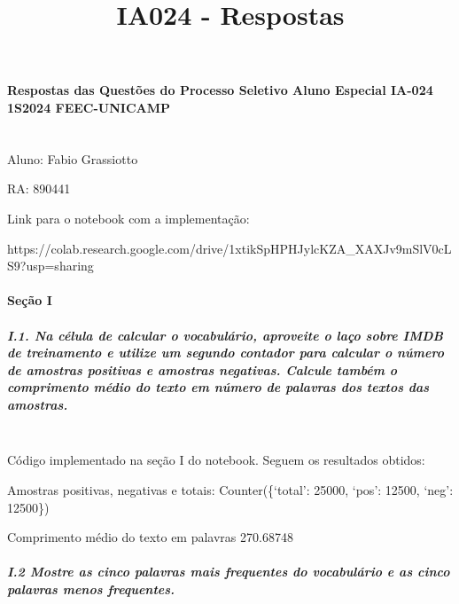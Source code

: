 \documentclass[11pt]{article}
\title{IA024 - Respostas}
\begin{document}
    
    \maketitle
    
    

    
    \paragraph{Respostas das Questões do Processo Seletivo Aluno Especial
IA-024 1S2024
FEEC-UNICAMP}\label{respostas-das-questuxf5es-do-processo-seletivo-aluno-especial-ia-024-1s2024-feec-unicamp}\mbox{} \\


Aluno: Fabio Grassiotto

RA: 890441


Link para o notebook com a implementação:

https://colab.research.google.com/drive/1xtikSpHPHJylcKZA\_XAXJv9mSlV0cLS9?usp=sharing

    \paragraph{Seção I}\label{seuxe7uxe3o-i}

\subparagraph{I.1. Na célula de calcular o vocabulário, aproveite o laço
sobre IMDB de treinamento e utilize um segundo contador para calcular o
número de amostras positivas e amostras negativas. Calcule também o
comprimento médio do texto em número de palavras dos textos das
amostras.}\label{i.1.-na-cuxe9lula-de-calcular-o-vocabuluxe1rio-aproveite-o-lauxe7o-sobre-imdb-de-treinamento-e-utilize-um-segundo-contador-para-calcular-o-nuxfamero-de-amostras-positivas-e-amostras-negativas.-calcule-tambuxe9m-o-comprimento-muxe9dio-do-texto-em-nuxfamero-de-palavras-dos-textos-das-amostras.}\mbox{} \\

Código implementado na seção I do notebook. Seguem os resultados
obtidos:

Amostras positivas, negativas e totais: Counter(\{`total': 25000, `pos':
12500, `neg': 12500\})

Comprimento médio do texto em palavras 270.68748

    \subparagraph{I.2 Mostre as cinco palavras mais frequentes do
vocabulário e as cinco palavras menos
frequentes.}\label{i.2-mostre-as-cinco-palavras-mais-frequentes-do-vocabuluxe1rio-e-as-cinco-palavras-menos-frequentes.}\mbox{} \\
\end{document}
